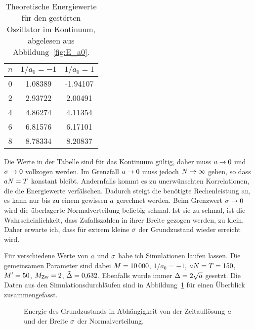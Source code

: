 \begin{table}[htbp]
    \centering
    \begin{tabular}{SSS}
        {$n$} & {$1/a_0 = -1$} & {$1/a_0 = 1$} \\
         & 1.08389 & -1.94107 \\
        2 & 2.93722 & 2.00491 \\
        4 & 4.86274 & 4.11354 \\
        6 & 6.81576 & 6.17101 \\
        8 & 8.78334 & 8.20837
    \end{tabular}
    \caption{%
        Theoretische Energiewerte für den gestörten Oszillator im Kontinuum,
        abgelesen aus Abbildung~\ref{fig:E_a0}.
    }
    \label{tab:E_a0}
\end{table}

Die Werte in der Tabelle sind für das Kontinuum gültig, daher muss $a
\to 0$ und $\sigma \to 0$ vollzogen werden. Im Grenzfall $a \to 0$
muss jedoch $N \to \infty$ gehen, so dass $a N = T$
konstant bleibt. Andernfalls kommt es zu unerwünschten Korrelationen, die die
Energiewerte verfälschen. Dadurch steigt die benötigte Rechenleistung an, es
kann nur bis zu einem gewissen $a$ gerechnet werden. Beim Grenzwert
$\sigma \to 0$ wird die überlagerte Normalverteilung beliebig schmal. Ist
sie zu schmal, ist die Wahrscheinlichkeit, dass Zufallszahlen in ihrer Breite
gezogen werden, zu klein. Daher erwarte ich, dass für extrem kleine
$\sigma$ der Grundzustand wieder erreicht wird.

Für verschiedene Werte von $a$ und $\sigma$ habe ich Simulationen
laufen lassen. Die gemeinsamen Parameter sind dabei $M =
\num{10000}$, $1/a_0 = \num{-1}$, $a N = T = \num{150}$,
$M' = \num{50}$, $M_\text{Zw} = \num{2}$,
$\tilde \Delta = \num{0.632}$. Ebenfalls wurde immer $\Delta = 2
\sqrt{a}$ gesetzt. Die Daten aus den Simulationsdurchläufen sind in
Abbildung~\ref{fig:mesh-e0} für einen Überblick zusammengefasst.

\begin{figure}[htbp]
    \centering
    \caption{%
        Energie des Grundzustands in Abhängigkeit von der Zeitauflösung
        $a$ und der Breite $\sigma$ der Normalverteilung.
    }
    \label{fig:mesh-e0}
\end{figure}

